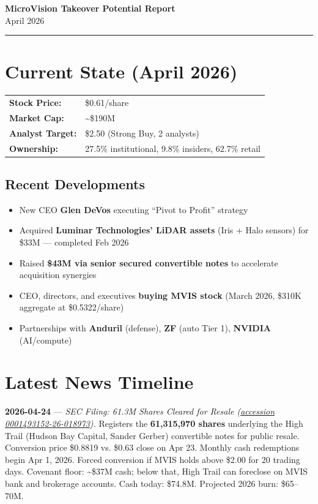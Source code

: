 \documentclass[11pt,letterpaper]{article}
\begin{document}
\begin{center}
{\LARGE\bfseries\color{secblue} MicroVision Takeover Potential Report}\\[0.4em]
{\large April 2026}
\end{center}

\vspace{0.5em}
\hrule
\vspace{1em}

\section{Current State (April 2026)}

\begin{tabularx}{\textwidth}{@{}lX@{}}
\textbf{Stock Price:} & \$0.61/share \\
\textbf{Market Cap:} & \textasciitilde\$190M \\
\textbf{Analyst Target:} & \$2.50 (Strong Buy, 2 analysts) \\
\textbf{Ownership:} & 27.5\% institutional, 9.8\% insiders, 62.7\% retail \\
\end{tabularx}

\subsection{Recent Developments}

\begin{itemize}
\item New CEO \textbf{Glen DeVos} executing ``Pivot to Profit'' strategy
\item Acquired \textbf{Luminar Technologies' LiDAR assets} (Iris + Halo sensors) for \$33M --- completed Feb 2026
\item Raised \textbf{\$43M via senior secured convertible notes} to accelerate acquisition synergies
\item CEO, directors, and executives \textbf{buying MVIS stock} (March 2026, \$310K aggregate at \$0.5322/share)
\item Partnerships with \textbf{Anduril} (defense), \textbf{ZF} (auto Tier 1), \textbf{NVIDIA} (AI/compute)
\end{itemize}

\section{Latest News Timeline}

{\color{datecyan}\textbf{2026-04-24}} --- \textit{SEC Filing: 61.3M Shares Cleared for Resale (\href{https://www.sec.gov/Archives/edgar/data/65770/000149315226018973/}{accession 0001493152-26-018973}).}
Registers the \textbf{61,315,970 shares} underlying the High Trail (Hudson Bay Capital, Sander Gerber) convertible notes for public resale. Conversion price \$0.8819 vs. \$0.63 close on Apr 23. Monthly cash redemptions begin Apr 1, 2026. Forced conversion if MVIS holds above \$2.00 for 20 trading days. Covenant floor: \textasciitilde\$37M cash; below that, High Trail can foreclose on MVIS bank and brokerage accounts. Cash today: \$74.8M. Projected 2026 burn: \$65--70M.
\end{document}
